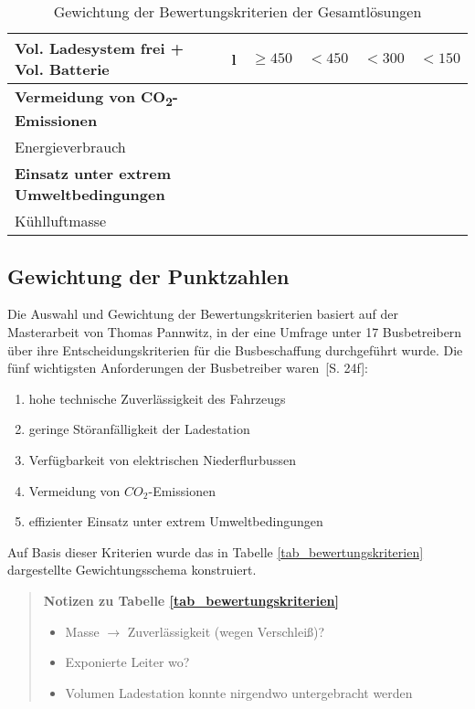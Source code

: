 \begin{table}
\begin{tabulary}{\linewidth}{LLllll}
		Vol. Ladesystem frei + Vol. Batterie                     & l              & $\ge 450$  & $<450$  & $<300$  & $<150$    \\ \midrule
		\textbf{Vermeidung von CO\textsubscript{2}-Emissionen}   &                &            &         &         &  \\
		Energieverbrauch                                         &                &            &         &         &  \\ \midrule
		\textbf{Einsatz unter extrem Umweltbedingungen}          &                &            &         &         &  \\
		Kühlluftmasse                                            &                &            &         &         &  \\ \bottomrule
	\end{tabulary}
	\caption{Gewichtung der Bewertungskriterien der Gesamtlösungen}
	\label{tab_punktzahlen}
\end{table} 

\subsection{Gewichtung der Punktzahlen}
Die Auswahl und Gewichtung der Bewertungskriterien basiert auf der Masterarbeit von Thomas Pannwitz, in der eine Umfrage unter 17 Busbetreibern über ihre Entscheidungskriterien für die Busbeschaffung durchgeführt wurde. Die fünf wichtigsten Anforderungen der Busbetreiber waren~\cite{pannwitz2014}[S. 24f]:
\begin{enumerate}
	\item hohe technische Zuverlässigkeit des Fahrzeugs
	\item geringe Störanfälligkeit der Ladestation
	\item Verfügbarkeit von elektrischen Niederflurbussen
	\item Vermeidung von $CO_2$-Emissionen
	\item effizienter Einsatz unter extrem Umweltbedingungen
\end{enumerate}

Auf Basis dieser Kriterien wurde das in Tabelle \ref{tab_bewertungskriterien} dargestellte Gewichtungsschema konstruiert.
\begin{quotation}	
	\textbf{Notizen zu Tabelle \ref{tab_bewertungskriterien}}
	\begin{itemize}
		\item Masse $\rightarrow$ Zuverlässigkeit (wegen Verschleiß)?
		\item Exponierte Leiter wo?
		\item Volumen Ladestation konnte nirgendwo untergebracht werden
	\end{itemize}
\end{quotation}

